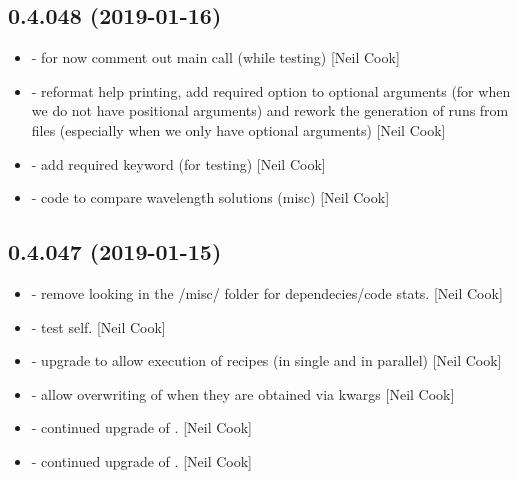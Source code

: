 \documentclass[a4paper,10pt,english]{report}
\begin{document}
\subsection{0.4.048 (2019-01-16)}
\label{\detokenize{misc/changelog:id215}}\begin{itemize}
\item {} 
 - for now comment out main call (while testing)
{[}Neil Cook{]}

\item {} 
 - reformat help printing, add required option to
optional arguments (for when we do not have positional arguments) and
rework the generation of runs from files (especially when we only have
optional arguments) {[}Neil Cook{]}

\item {} 
 - add required keyword (for testing) {[}Neil Cook{]}

\item {} 
 - code to compare wavelength solutions (misc) {[}Neil Cook{]}

\end{itemize}


\subsection{0.4.047 (2019-01-15)}
\label{\detokenize{misc/changelog:id216}}\begin{itemize}
\item {} 
 - remove looking in the /misc/ folder for
dependecies/code stats. {[}Neil Cook{]}

\item {} 
 - test self. {[}Neil Cook{]}

\item {} 
 - upgrade to allow execution of recipes (in single
and in parallel) {[}Neil Cook{]}

\item {} 
 - allow overwriting of  when they are
obtained via kwargs  {[}Neil Cook{]}

\item {} 
 - continued upgrade of . {[}Neil Cook{]}

\item {} 
 - continued upgrade of . {[}Neil Cook{]}

\end{itemize}
\end{document}
